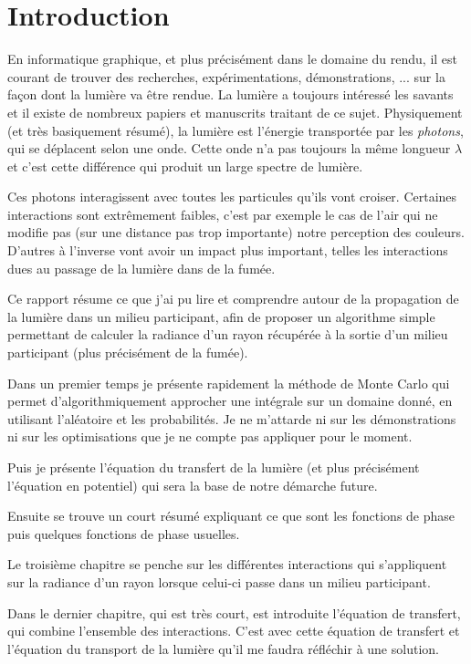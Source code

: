 \chapter*{Introduction}

En informatique graphique, et plus précisément dans le domaine du rendu, il est courant de trouver des recherches, expérimentations, démonstrations, ... sur la façon dont la lumière va être rendue. La lumière a toujours intéressé les savants et il existe de nombreux papiers et manuscrits traitant de ce sujet. Physiquement (et très basiquement résumé), la lumière est l'énergie transportée par les \textit{photons}, qui se déplacent selon une onde. Cette onde n'a pas toujours la même longueur $\lambda$ et c'est cette différence qui produit un large spectre de lumière.\par
Ces photons interagissent avec toutes les particules qu'ils vont croiser. Certaines interactions sont extrêmement faibles, c'est par exemple le cas de l'air qui ne modifie pas (sur une distance pas trop importante) notre perception des couleurs. D'autres à l'inverse vont avoir un impact plus important, telles les interactions dues au passage de la lumière dans de la fumée.\newline\par

Ce rapport résume ce que j'ai pu lire et comprendre autour de la propagation de la lumière dans un milieu participant, afin de proposer un algorithme simple permettant de calculer la radiance d'un rayon récupérée à la sortie d'un milieu participant (plus précisément de la fumée).\newline\par

Dans un premier temps je présente rapidement la méthode de Monte Carlo qui permet d'algorithmiquement approcher une intégrale sur un domaine donné, en utilisant l'aléatoire et les probabilités. Je ne m'attarde ni sur les démonstrations ni sur les optimisations que je ne compte pas appliquer pour le moment.\par
Puis je présente l'équation du transfert de la lumière (et plus précisément l'équation en potentiel) qui sera la base de notre démarche future.\par
Ensuite se trouve un court résumé expliquant ce que sont les fonctions de phase puis quelques fonctions de phase usuelles.\par
Le troisième chapitre se penche sur les différentes interactions qui s'appliquent sur la radiance d'un rayon lorsque celui-ci passe dans un milieu participant.\par
Dans le dernier chapitre, qui est très court, est introduite l'équation de transfert, qui combine l'ensemble des interactions. C'est avec cette équation de transfert et l'équation du transport de la lumière qu'il me faudra réfléchir à une solution.\par